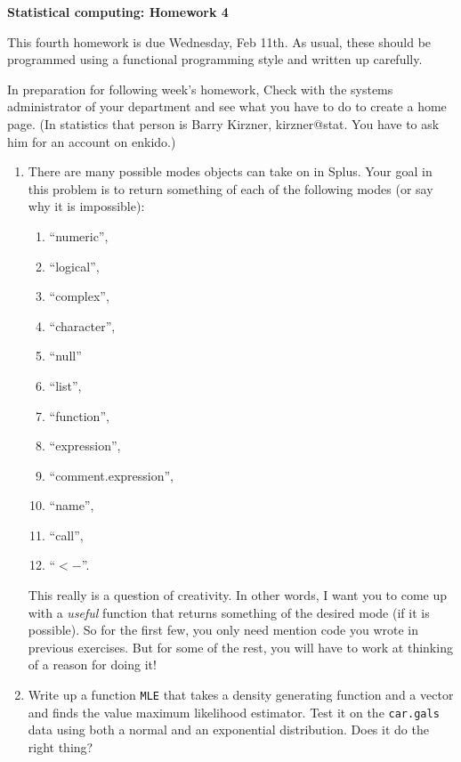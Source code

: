 \renewcommand{\baselinestretch}{1.2}

\centerline{\bf Statistical computing: Homework 4}

\vspace{2ex}

This fourth homework is due Wednesday, Feb 11th.  As usual, these
should be programmed using a functional programming style and written
up carefully.

In preparation for following week's homework, Check with the systems
administrator of your department and see what you have to do to create
a home page.  (In statistics that person is Barry Kirzner,
kirzner@stat.  You have to ask him for an account on enkido.)  

\begin{enumerate}
\item There are many possible modes objects can take on in Splus.
Your goal in this problem is to return something of each of the
following modes (or say why it is impossible): 
\begin{enumerate}
\begin{enumerate}
\item  ``numeric'', 
\item ``logical'',
\item ``complex'',
\item  ``character'', 
\item ``null''
\item ``list'', 
\item  ``function'', 
\item ``expression'',
\item  ``comment.expression'',
\item ``name'',
\item  ``call'',
\item  ``$<-$''.
\end{enumerate}
\end{enumerate}
This really is a question of creativity.  In other words, I want you
to come up with a {\em useful} function that returns something of the
desired mode (if it is possible).  So for the first few, you only need
mention code you wrote in previous exercises.  But for some of the
rest, you will have to work at thinking of a reason for doing it!

\item Write up a function {\tt MLE} that takes a density generating
function and a vector and finds the value maximum likelihood
estimator.  Test it on the {\tt car.gals} data using both a normal and
an exponential distribution.  Does it do the right thing?


\end{enumerate}
